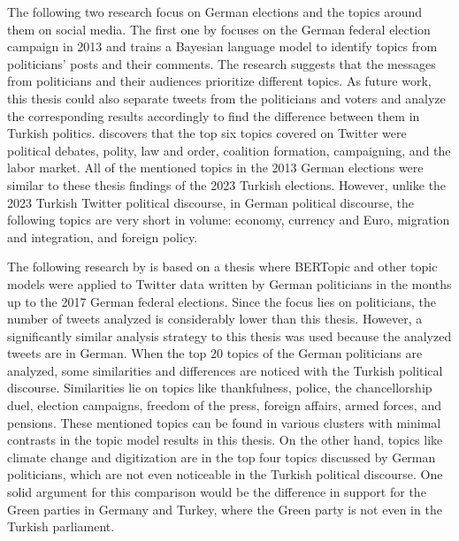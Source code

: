 The following two research focus on German elections and the topics around them on social media. 
The first one by \textcite{stier_germany_election_2018} focuses on the German federal election 
campaign in 2013 and trains a Bayesian language model to identify topics from politicians' posts 
and their comments. The research suggests that the messages from politicians and their audiences 
prioritize different topics. As future work, this thesis could also separate tweets from the 
politicians and voters and analyze the corresponding results accordingly to find the difference 
between them in Turkish politics. \textcite{stier_germany_election_2018} discovers that the top six 
topics covered on Twitter were political debates, polity, law and order, coalition formation, 
campaigning, and the labor market. All of the mentioned topics in the 2013 German elections were 
similar to these thesis findings of the 2023 Turkish elections. However, unlike the 2023 Turkish 
Twitter political discourse, in German political discourse, the following topics are very short in 
volume: economy, currency and Euro, migration and integration, and foreign policy. 

The following research by \textcite{bertopic_twitter_german_politics_2022} is based on a thesis where 
BERTopic and other topic models were applied to Twitter data written by German politicians in the 
months up to the 2017 German federal elections. Since the focus lies on politicians, the number of 
tweets analyzed is considerably lower than this thesis. However, a significantly similar analysis 
strategy to this thesis was used because the analyzed tweets are in German. When the top 20 topics 
of the German politicians are analyzed, some similarities and differences are noticed with the 
Turkish political discourse. Similarities lie on topics like thankfulness, police, the chancellorship 
duel, election campaigns, freedom of the press, foreign affairs, armed forces, and pensions. 
These mentioned topics can be found in various clusters with minimal contrasts in the topic model 
results in this thesis. On the other hand, topics like climate change and digitization are in 
the top four topics discussed by German politicians, which are not even noticeable in the Turkish 
political discourse. One solid argument for this comparison would be the difference in support for 
the Green parties in Germany and Turkey, where the Green party is not even in the Turkish parliament. 


